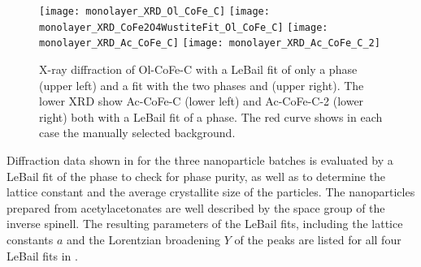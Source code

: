 \documentclass[\main/dresen_thesis.tex]{subfiles}
\begin{document}
  \label{sec:monolayers:nanoparticle:xrd}
  \begin{figure}[tb]
    \centering
    \texttt{[image: monolayer\_XRD\_Ol\_CoFe\_C]}
    \texttt{[image: monolayer\_XRD\_CoFe2O4WustiteFit\_Ol\_CoFe\_C]}
    \texttt{[image: monolayer\_XRD\_Ac\_CoFe\_C]}
    \texttt{[image: monolayer\_XRD\_Ac\_CoFe\_C\_2]}
    \caption{\label{fig:monolayers:nanoparticle:xrd}X-ray diffraction of Ol-CoFe-C with a LeBail fit of only a  phase (upper left) and a fit with the two phases  and  (upper right). The lower XRD show Ac-CoFe-C (lower left) and Ac-CoFe-C-2 (lower right) both with a LeBail fit of a  phase. The red curve shows in each case the manually selected background.}
  \end{figure}

  Diffraction data shown in  for the three nanoparticle batches is evaluated by a LeBail fit of the phase to check for phase purity, as well as to determine the lattice constant and the average crystallite size of the particles.
  The nanoparticles prepared from acetylacetonates are well described by the space group of the inverse spinell.
  The resulting parameters of the LeBail fits, including the lattice constants $a$ and the Lorentzian broadening $Y$ of the peaks are listed for all four LeBail fits in .
\end{document}
